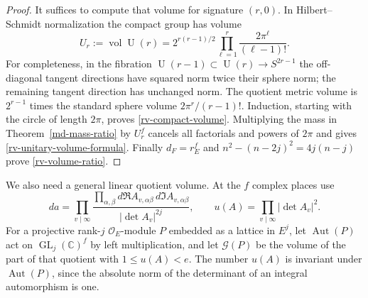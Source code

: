 \begin{proof}
It suffices to compute that volume for signature $(r,0)$.
In Hilbert--Schmidt normalization the compact group has
volume
\begin{equation}\label{rv-compact-volume}
 U_r:=\operatorname{vol}\operatorname U(r)
      =2^{r(r-1)/2}\prod_{\ell=1}^{r}
                        \frac{2\pi^\ell}{(\ell-1)!}.
\end{equation}
For completeness, in the fibration
$\operatorname U(r-1)\subset\operatorname U(r)\to S^{2r-1}$
the off-diagonal tangent directions have squared norm
twice their sphere norm; the remaining tangent direction
has unchanged norm.  The quotient metric volume is
$2^{r-1}$ times the standard sphere volume
$2\pi^r/(r-1)!$.  Induction, starting with the circle
of length $2\pi$, proves \eqref{rv-compact-volume}.
Multiplying the mass in Theorem~\ref{md-mass-ratio} by
$U_r^f$ cancels all factorials and powers of $2\pi$ and
gives \eqref{rv-unitary-volume-formula}.
Finally $d_F=r_E^f$ and
$n^2-(n-2j)^2=4j(n-j)$ prove \eqref{rv-volume-ratio}.
\end{proof}

We also need a general linear quotient volume.  At the
$f$ complex places use
\[
 da=\prod_{v\mid\infty}
              \frac{\prod_{\alpha,\beta}
                     d\Re A_{v,\alpha\beta}\,
                     d\Im A_{v,\alpha\beta}}
                   {|\det A_v|^{2j}},
 \qquad
 u(A)=\prod_{v\mid\infty}|\det A_v|^2.
\]
For a projective rank-$j$ $\mathcal O_E$-module $P$ embedded
as a lattice in $E^j$, let $\operatorname{Aut}(P)$ act on
$\operatorname{GL}_j(\mathbb C)^f$ by left multiplication,
and let $\mathcal G(P)$ be the volume of the part of that
quotient with $1\le u(A)<e$.
The number $u(A)$ is invariant under $\operatorname{Aut}(P)$,
since the absolute norm of the determinant of an integral
automorphism is one.

